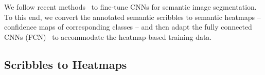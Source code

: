 We follow recent methods~\citep{rcnn, Long_2015_CVPR, crfasrnn} to
fine-tune CNNs for semantic image segmentation. To this end, we
convert the annotated semantic scribbles to semantic heatmaps --
confidence maps of corresponding classes -- and then adapt the fully
connected CNNs (FCN)~\citep{Long_2015_CVPR} to accommodate the
heatmap-based training data.

\subsection{Scribbles to Heatmaps} 
\label{drawtell:sec:scribble}


